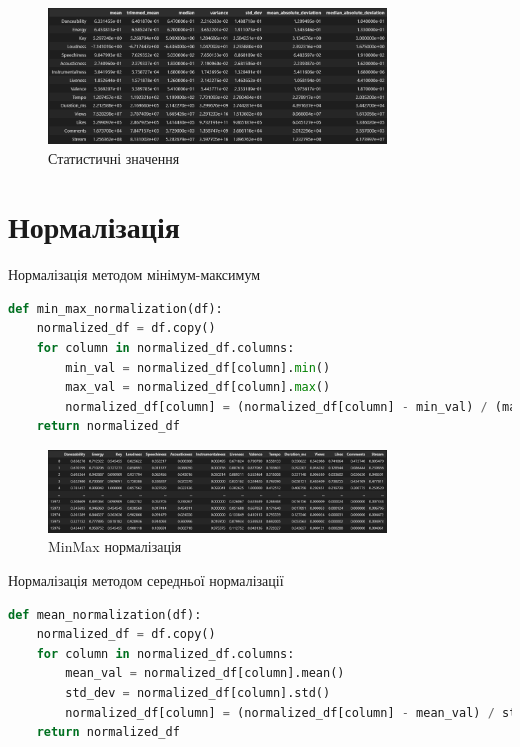 \documentclass{article}
\begin{document}
\begin{figure}
    \centering
    \includegraphics[width=0.8\textwidth]{img/statisticalNumbers.png} %
    \caption{Статистичні значення} %
    \label{fig:statistical_numbers} %
\end{figure}
\newpage
\section{Нормалізація}
Нормалізація методом мінімум-максимум
\begin{lstlisting}[language=Python]
def min_max_normalization(df):
    normalized_df = df.copy()
    for column in normalized_df.columns:
        min_val = normalized_df[column].min()
        max_val = normalized_df[column].max()
        normalized_df[column] = (normalized_df[column] - min_val) / (max_val - min_val)
    return normalized_df
\end{lstlisting}
\begin{figure}[ht]
    \centering
    \includegraphics[width=0.8\textwidth]{img/minmax.png} %
    \caption{MinMax нормалізація} %
    \label{fig:minmax} %
\end{figure}
\newpage
Нормалізація методом середньої нормалізації
\begin{lstlisting}[language=Python]
def mean_normalization(df):
    normalized_df = df.copy()
    for column in normalized_df.columns:
        mean_val = normalized_df[column].mean()
        std_dev = normalized_df[column].std()
        normalized_df[column] = (normalized_df[column] - mean_val) / std_dev
    return normalized_df
\end{lstlisting}
\end{document}
